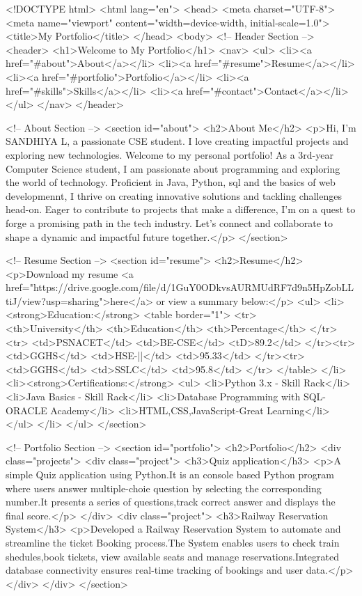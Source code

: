 <!DOCTYPE html>
<html lang="en">
<head>
    <meta charset="UTF-8">
    <meta name="viewport" content="width=device-width, initial-scale=1.0">
    <title>My Portfolio</title>
    </head>
<body>
    <!-- Header Section -->
    <header>
        <h1>Welcome to My Portfolio</h1>
        <nav>
            <ul>
                <li><a href="#about">About</a></li>
                <li><a href="#resume">Resume</a></li>
                <li><a href="#portfolio">Portfolio</a></li>
                <li><a href="#skills">Skills</a></li>
                <li><a href="#contact">Contact</a></li>
            </ul>
        </nav>
    </header>

    <!-- About Section -->
    <section id="about">
        <h2>About Me</h2>
        <p>Hi, I'm SANDHIYA L, a passionate CSE student. I love creating impactful projects and exploring new technologies. Welcome to my personal portfolio! As a  3rd-year Computer Science student, I am passionate about programming and exploring the world of technology. Proficient in  Java, Python, sql and the basics of web developmennt, I thrive on creating innovative solutions and tackling challenges head-on. Eager to contribute to projects that make a difference, I'm on a quest to forge a promising path in the tech industry. Let's connect and collaborate to shape a dynamic and impactful future together.</p>
    </section>

    <!-- Resume Section -->
    <section id="resume">
        <h2>Resume</h2>
        <p>Download my resume <a href="https://drive.google.com/file/d/1GuY0ODkvsAURMUdRF7d9n5HpZobLLtiJ/view?usp=sharing">here</a> or view a summary below:</p>
        <ul>
            <li><strong>Education:</strong>
			<table border="1">
			<tr>
			<th>University</th>
			<th>Education</th>
			<th>Percentage</th>
			</tr>
			<tr>
			<td>PSNACET</td>
			<td>BE-CSE</td>
			<tD>89.2</td>
			</tr><tr>
			<td>GGHS</td>
			<td>HSE-||</td>
			<td>95.33</td>
			</tr><tr>
			<td>GGHS</td>
			<td>SSLC</td>
			<td>95.8</td>
			</tr>
			</table>
			</li>
            <li><strong>Certifications:</strong>
			<ul>
			<li>Python 3.x - Skill Rack</li>
			<li>Java Basics - Skill Rack</li>
			<li>Database Programming with SQL-ORACLE Academy</li>
			<li>HTML,CSS,JavaScript-Great Learning</li>
			</ul>
			</li>
        </ul>
    </section>

    <!-- Portfolio Section -->
    <section id="portfolio">
        <h2>Portfolio</h2>
        <div class="projects">
            <div class="project">
                <h3>Quiz application</h3>
                <p>A simple Quiz application using Python.It is an console based Python program where users answer multiple-choie question by selecting the corresponding number.It presents a series of questions,track correct answer and displays the final score.</p>
            </div>
            <div class="project">
                <h3>Railway Reservation System</h3>
                <p>Developed a Railway Reservation System to automate and streamline the ticket Booking process.The System enables users to check train shedules,book tickets, view available seats and manage reservations.Integrated database connectivity ensures real-time tracking of bookings and user data.</p>
            </div>
        </div>
    </section>

